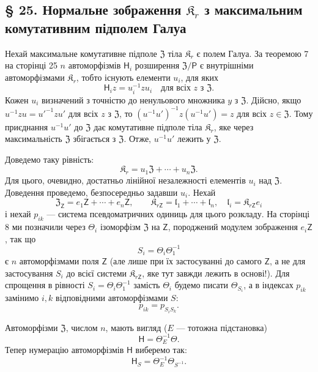 \documentclass[11pt]{article}
\begin{document}
\subsection*{§ 25. Нормальне зображення \(\mathfrak K_r\) з максимальним комутативним підполем Галуа\protect\footnotemark}
\label{normaldarstellung-von-r_r-mit-galoisschem-maximalem-kommutativem-teilkoerper-1}

Нехай максимальне комутативне підполе \(\mathfrak Z\) тіла \(\mathfrak K_r\) є полем Галуа. За теоремою 7 на сторінці 25 \(n\) автоморфізмів \(\mathsf{H}_i\) розширення \(\mathfrak Z/\mathsf P\) є внутрішніми автоморфізмами \(\mathfrak K_r\), тобто існують елементи \(u_i\), для яких
\[
\mathsf{H}_i z=u_i^{-1}zu_i\quad\text{для всіх }z\text{ з }\mathfrak Z.
\]
Кожен \(u_i\) визначений з точністю до ненульового множника \(y\) з \(\mathfrak Z\). Дійсно, якщо \(u^{-1}zu=u'^{-1}zu'\) для всіх \(z\) з \(\mathfrak Z\), то \((u^{-1}u')^{-1}z(u^{-1}u')=z\) для всіх \(z\in\mathfrak Z\). Тому приєднання \(u^{-1}u'\) до \(\mathfrak Z\) дає комутативне підполе тіла \(\mathfrak K_r\), яке через максимальність \(\mathfrak Z\) збігається з \(\mathfrak Z\). Отже, \(u^{-1}u'\) лежить у \(\mathfrak Z\).

Доведемо таку рівність:
\[
\mathfrak K_r=u_1\mathfrak Z+\cdots+u_n\mathfrak Z.
\]
Для цього, очевидно, достатньо лінійної незалежності елементів \(u_i\) над \(\mathfrak Z\). Доведення проведемо, безпосередньо задавши \(u_i\). Нехай
\[
\mathfrak Z_{\mathsf{Z}}=e_1\mathsf{Z}+\cdots+e_n\mathsf{Z},\qquad
\mathfrak K_{r\mathsf{Z}}=\mathfrak l_1+\cdots+\mathfrak l_n,\quad
\mathfrak l_i=\mathfrak K_{r\mathsf{Z}}e_i
\]
і нехай \(p_{ik}\) --- система псевдоматричних одиниць для цього розкладу. На сторінці 8 ми позначили через \(\Theta_i\) ізоморфізм \(\mathfrak Z\) на \(\mathsf{Z}\), породжений модулем зображення \(e_i\mathsf{Z}\), так що
\[
S_i=\Theta_i\Theta_1^{-1}
\]
є \(n\) автоморфізмами поля \(\mathsf{Z}\) (але лише при їх застосуванні до самого \(\mathsf{Z}\), а не для застосування \(S_i\) до всієї системи \(\mathfrak K_{r\mathsf{Z}}\), яке тут завжди лежить в основі!). Для спрощення в рівності \(S_i=\Theta_i\Theta_1^{-1}\) замість \(\Theta_i\) будемо писати \(\Theta_{S_i}\), а в індексах \(p_{ik}\) замінимо \(i,k\) відповідними автоморфізмами \(S\):
\[
p_{ik}=p_{S_iS_k}.
\]

Автоморфізми \(\mathfrak Z\), числом \(n\), мають вигляд (\(E\) --- тотожна підстановка)
\[
\mathsf{H}=\Theta_E^{-1}\Theta.
\]
Тепер нумерацію автоморфізмів \(\mathsf{H}\) виберемо так:
\[
\mathsf{H}_S=\Theta_E^{-1}\Theta_{S^{-1}}.
\]
\end{document}
